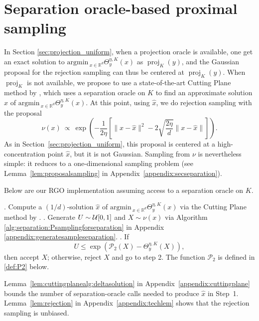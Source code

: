 \documentclass[11pt,letterpaper]{article}
\newcommand{\R}{\mathbb{R}}
\newcommand{\proj}{\operatorname{proj}}
\newcommand{\argmin}{\mathrm{argmin}\,}
\newcommand{\brac}[1]{\left( #1\right)}
\begin{document}
\section{Separation oracle-based proximal sampling}

\label{sec:separation_uniform}


In Section \ref{sec:projection_uniform}, when a projection oracle is available, one get an exact solution to $\argmin_{x\in \R^d} \Theta^{\eta,K}_y(x)$ as $\proj_K(y)$, and the Gaussian proposal for the rejection sampling can thus be centered at $\proj_K(y)$. When $\proj_K$ is not available, we propose to use a state-of-the-art Cutting Plane method by \cite{jiang2020cuttingplane}, which uses a separation oracle on $K$ to find an approximate solution $\hat{x}$ of $\argmin_{x\in \R^d} \Theta^{\eta,K}_y(x)$. At this point, using $\hat{x}$, we do rejection sampling with the proposal
\[
\nu(x)\ \propto\ \exp\left(-\frac{1}{2\eta}\left[\|x-\hat x\|^2-2\sqrt{\frac{2\eta}{d}}\|x-\hat x\|\right]\right).
\]
As in Section~\ref{sec:projection_uniform}, this proposal is centered at a high-concentration point $\hat x$, but it is not Gaussian. Sampling from $\nu$ is nevertheless simple: it reduces to a one-dimensional sampling problem (see Lemma~\ref{lem:proposalsampling} in Appendix~\ref{appendix:secseparation}).


Below are our RGO implementation assuming access to a separation oracle on $K$.
\begin{algorithm}[H]
	\caption{Separation oracle-based implementation of RGO} 
	\label{alg:RGO:uniform:separation}
	\begin{algorithmic}
		. Compute a $(1/d)$-solution $\hat{x}$ of $\argmin_{x\in \R^d} \Theta^{\eta,K}_y(x)$ via the Cutting Plane method by \cite{jiang2020cuttingplane}.
		. Generate $U\sim {\cal U}[0,1]$ and $X\sim \nu(x)$ via Algorithm \ref{alg:separation:Psamplingforseparation} in Appendix \ref{appendix:generatesampleseparation}.
		. If 
		\begin{equation}\label{eq:event_uniform:separation}
			U \le \exp\brac{\mathcal{P}_2(X) - \Theta_y^{\eta,K}(X)},
		\end{equation}
		then accept $X$; otherwise, reject $X$ and go to step 2. The function $\mathcal{P}_2$ is defined in \eqref{def:P2} below.
	\end{algorithmic}
\end{algorithm}


Lemma~\ref{lem:cuttingplanealg:deltasolution} in Appendix~\ref{appendix:cuttingplane} bounds the number of separation-oracle calls needed to produce $\hat x$ in Step~1. Lemma~\ref{lem:rejection} in Appendix~\ref{appendix:techlem} shows that the rejection sampling is unbiased.
\end{document}

